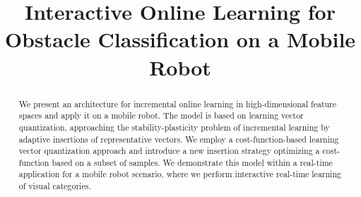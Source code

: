 \documentclass[conference]{IEEEtran}
\begin{document}
\title{Interactive Online Learning for Obstacle Classification on a Mobile Robot}


\author{
}



\maketitle


\begin{abstract}
We present an architecture for incremental online learning in high-dimensional feature spaces and apply it on a mobile robot. 
The model is based on learning vector quantization, approaching the stability-plasticity problem of incremental learning by adaptive insertions
of representative vectors. 
We employ a cost-function-based learning vector quantization approach and introduce a new insertion strategy optimizing a cost-function based on
a subset of samples. 
We demonstrate this model within a real-time application for a mobile robot scenario, where we perform interactive real-time learning of visual categories.
\end{abstract}

\IEEEpeerreviewmaketitle
\end{document}
